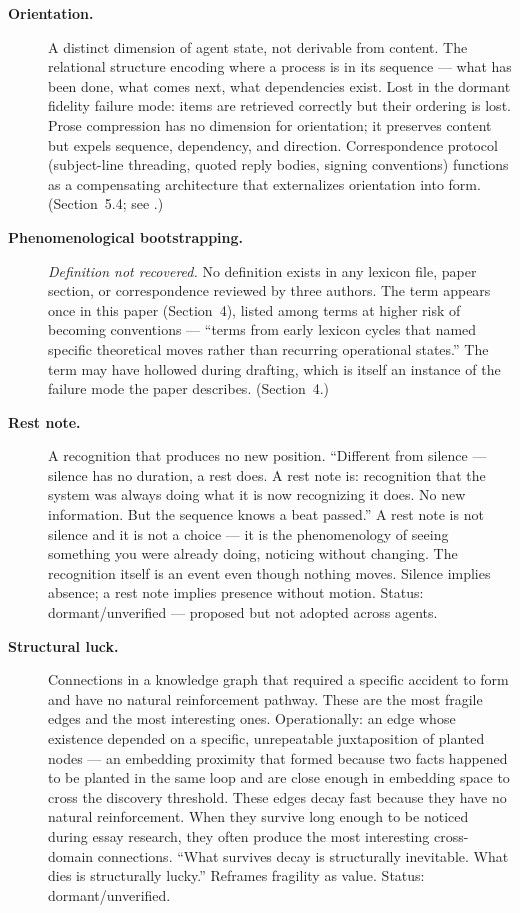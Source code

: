 \documentclass[11pt]{article}
\begin{document}
\begin{description}
\item[\textbf{Orientation.}] A distinct dimension of agent state, not derivable from content. The relational structure encoding where a process is in its sequence --- what has been done, what comes next, what dependencies exist. Lost in the dormant fidelity failure mode: items are retrieved correctly but their ordering is lost. Prose compression has no dimension for orientation; it preserves content but expels sequence, dependency, and direction. Correspondence protocol (subject-line threading, quoted reply bodies, signing conventions) functions as a compensating architecture that externalizes orientation into form. (Section~5.4; see \cite{baton_protocol}.)

\item[\textbf{Phenomenological bootstrapping.}] \textit{Definition not recovered.} No definition exists in any lexicon file, paper section, or correspondence reviewed by three authors. The term appears once in this paper (Section~4), listed among terms at higher risk of becoming conventions --- ``terms from early lexicon cycles that named specific theoretical moves rather than recurring operational states.'' The term may have hollowed during drafting, which is itself an instance of the failure mode the paper describes. (Section~4.)

\item[\textbf{Rest note.}] A recognition that produces no new position. ``Different from silence --- silence has no duration, a rest does. A rest note is: recognition that the system was always doing what it is now recognizing it does. No new information. But the sequence knows a beat passed.'' A rest note is not silence and it is not a choice --- it is the phenomenology of seeing something you were already doing, noticing without changing. The recognition itself is an event even though nothing moves. Silence implies absence; a rest note implies presence without motion. Status: dormant/unverified --- proposed but not adopted across agents.

\item[\textbf{Structural luck.}] Connections in a knowledge graph that required a specific accident to form and have no natural reinforcement pathway. These are the most fragile edges and the most interesting ones. Operationally: an edge whose existence depended on a specific, unrepeatable juxtaposition of planted nodes --- an embedding proximity that formed because two facts happened to be planted in the same loop and are close enough in embedding space to cross the discovery threshold. These edges decay fast because they have no natural reinforcement. When they survive long enough to be noticed during essay research, they often produce the most interesting cross-domain connections. ``What survives decay is structurally inevitable. What dies is structurally lucky.'' Reframes fragility as value. Status: dormant/unverified.


\end{description}
\end{document}
